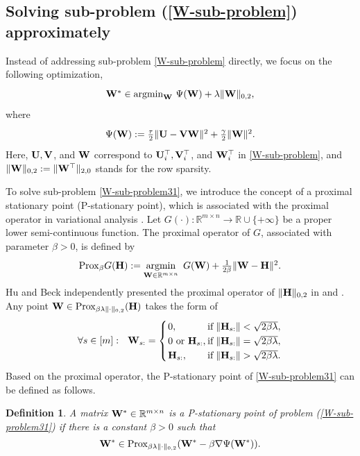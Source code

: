 \documentclass[journal]{IEEEtran}
\newtheorem{definition}{Definition}
\newcommand{\ba}{\begin{array}}
\newcommand{\ea}{\end{array}}
\newcommand{\be}{\begin{equation}}
\newcommand{\ee}{\end{equation}}
\def\R{\mathbb{R}}
\def\H{{\bf H}}
\def\U{{\bf U}}
\def\V{{\bf V}}
\def\W{{\bf W}}
\begin{document}
\subsection{Solving  sub-problem (\ref{W-sub-problem}) approximately}

Instead of addressing sub-problem \eqref{W-sub-problem} directly, we focus on the following optimization,
\be\label{W-sub-problem31}
\ba{cl}
\W^*\in{\rm argmin}_{\W}~  \Psi(\W)  +\lambda \|\W\|_{0,2},
\ea\ee
where
\be
\ba{cl}
 \Psi(\W):=\frac{\tau}{2}\|\U-\V\W\|^2+\frac{\gamma}{2} \|\W\|^2.\nonumber
\ea\ee
Here, $\U, \V$, and $\W$ correspond to $\U_i^\top, \V_i^\top$, and $\W_i^\top$ in \eqref{W-sub-problem}, and  $\|\W\|_{0,2}:=\|\W^\top\|_{2,0}$ stands for the row sparsity.



To solve sub-problem \eqref{W-sub-problem31}, we introduce the concept of a proximal stationary point (P-stationary point), which is associated with the proximal operator in variational analysis \cite{Rockafellar1998}.  Let $G(\cdot):{\mathbb R}^{m\times n}\rightarrow  \R\cup\{+\infty\}$ be a proper lower semi-continuous function. The proximal operator of $G$, associated with  parameter $\beta>0$, is defined by
\begin{eqnarray}\label{def-prox}
\begin{array}{l}
{\rm Prox}_{\beta } G(\H):=\operatorname*{argmin}\limits_{\W\in \R^{m\times n}}~G(\W)+ \frac{1}{2\beta}\|\W-\H\|^2.
\end{array}
\end{eqnarray}
Hu and Beck independently presented the proximal operator of $\|\H\|_{0,2}$ in \cite[Proposition 18]{Hu2017} and \cite[Theorem 3.2]{Beck2019}. Any point  $\W\in{\rm Prox}_{\beta\lambda\|\cdot\|_{0,2}}(\H)$ takes the form of
\begin{eqnarray}\label{Proxl0}
\forall s\in[m]:~~  \W_{s:}=\left\{
 \arraycolsep=1.0pt\def\arraystretch{1.25}
\begin{array}{lll}
0, &{\rm if}&\|\H_{s:}\|<\sqrt{2\beta\lambda},\\
0~{\rm or}~\H_{s:}, &{\rm if}&\|\H_{s:}\|=\sqrt{2\beta\lambda},\\
\H_{s:}, &{\rm if}&\|\H_{s:}\|>\sqrt{2\beta\lambda}.
\end{array} \right.
\end{eqnarray}
Based on the proximal operator, the P-stationary point of  \eqref{W-sub-problem31} can be defined as follows.
\begin{definition}\label{def-S-prox2}
A matrix $\W^*\in\R^{m\times n}$ is a P-stationary point of  problem (\ref{W-sub-problem31}) if there is a constant $\beta>0$ such that
\be\label{P-CW}
    \W^* \in {\rm Prox}_{\beta \lambda\|\cdot\|_{0,2}}(\W^*-\beta \nabla \Psi(\W^*)).\ee
\end{definition}
\end{document}
